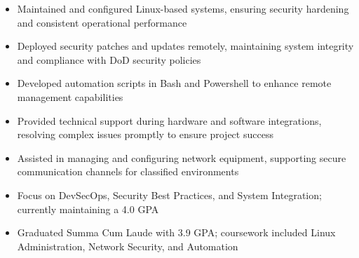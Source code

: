 \par\smallskip
\noindent
\begin{minipage}{20cm}
  \begin{minipage}{9.75cm}
    \begin{itemize}
      \item Maintained and configured Linux-based systems, ensuring security hardening and consistent operational performance
      \item Deployed security patches and updates remotely, maintaining system integrity and compliance with DoD security policies
      \item Developed automation scripts in Bash and Powershell to enhance remote management capabilities
    \end{itemize}
  \end{minipage}
  \hfill
  \begin{minipage}{9.75cm}
    \begin{itemize}
      \item Provided technical support during hardware and software integrations, resolving complex issues promptly to ensure project success
      \item Assisted in managing and configuring network equipment, supporting secure communication channels for classified environments
    \end{itemize}
  \end{minipage}
\end{minipage}

\begin{itemize}
  \item Focus on DevSecOps, Security Best Practices, and System Integration; currently maintaining a 4.0 GPA
\end{itemize}
\divider

\begin{itemize}
  \item Graduated Summa Cum Laude with 3.9 GPA; coursework included Linux Administration, Network Security, and Automation
\end{itemize}

\noindent
\begin{minipage}{20cm}
      
       
      
   
\end{minipage}


